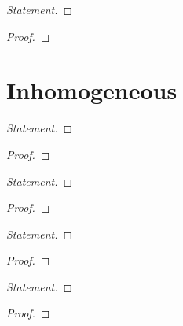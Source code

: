 \begin{proof}[Statement]\renewcommand{\qedsymbol}{}

\end{proof}
\begin{proof}[Proof]\renewcommand{\qedsymbol}{}

\end{proof}

\section*{Inhomogeneous}


\begin{proof}[Statement]\renewcommand{\qedsymbol}{}

\end{proof}
\begin{proof}[Proof]\renewcommand{\qedsymbol}{}

\end{proof}


\begin{proof}[Statement]\renewcommand{\qedsymbol}{}

\end{proof}
\begin{proof}[Proof]\renewcommand{\qedsymbol}{}

\end{proof}


\begin{proof}[Statement]\renewcommand{\qedsymbol}{}

\end{proof}
\begin{proof}[Proof]\renewcommand{\qedsymbol}{}

\end{proof}


\begin{proof}[Statement]\renewcommand{\qedsymbol}{}

\end{proof}
\begin{proof}[Proof]\renewcommand{\qedsymbol}{}

\end{proof}


